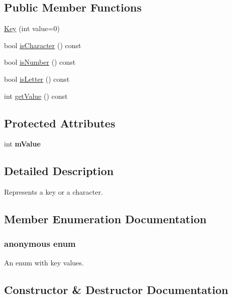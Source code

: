 \subsection*{Public Member Functions}
\begin{DoxyCompactItemize}
\item 
\hyperlink{classgcn_1_1Key_ab00cf2a6d1ac5918ee154b783b9b8ee7}{Key} (int value=0)
\item 
bool \hyperlink{classgcn_1_1Key_ad72a9287cc168b3b9bb537a5a2a4e76e}{is\+Character} () const 
\item 
bool \hyperlink{classgcn_1_1Key_a530762f62760d3be1458e5587ca53612}{is\+Number} () const 
\item 
bool \hyperlink{classgcn_1_1Key_aebedd4bb8cb096dd30663db2da27eedb}{is\+Letter} () const 
\item 
int \hyperlink{classgcn_1_1Key_a38e99ab37c60df7a03c1c407db2b098f}{get\+Value} () const 
\end{DoxyCompactItemize}
\subsection*{Protected Attributes}
\begin{DoxyCompactItemize}
\item 
int {\bfseries m\+Value}\hypertarget{classgcn_1_1Key_aaf53b4b32cad73a822c9b4e022721054}{}\label{classgcn_1_1Key_aaf53b4b32cad73a822c9b4e022721054}

\end{DoxyCompactItemize}


\subsection{Detailed Description}
Represents a key or a character. 

\subsection{Member Enumeration Documentation}
\subsubsection[{\texorpdfstring{anonymous enum}{anonymous enum}}]{\setlength{\rightskip}{0pt plus 5cm}anonymous enum}\hypertarget{classgcn_1_1Key_ae6310e95e8749f3310c6ddf06a423b64}{}\label{classgcn_1_1Key_ae6310e95e8749f3310c6ddf06a423b64}
An enum with key values. 

\subsection{Constructor \& Destructor Documentation}
